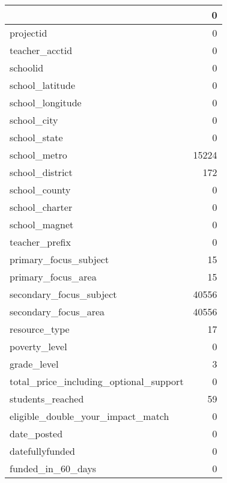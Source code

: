 \begin{tabular}{lr}
\toprule
{} &      0 \\
\midrule
projectid                              &      0 \\
teacher\_acctid                         &      0 \\
schoolid                               &      0 \\
school\_latitude                        &      0 \\
school\_longitude                       &      0 \\
school\_city                            &      0 \\
school\_state                           &      0 \\
school\_metro                           &  15224 \\
school\_district                        &    172 \\
school\_county                          &      0 \\
school\_charter                         &      0 \\
school\_magnet                          &      0 \\
teacher\_prefix                         &      0 \\
primary\_focus\_subject                  &     15 \\
primary\_focus\_area                     &     15 \\
secondary\_focus\_subject                &  40556 \\
secondary\_focus\_area                   &  40556 \\
resource\_type                          &     17 \\
poverty\_level                          &      0 \\
grade\_level                            &      3 \\
total\_price\_including\_optional\_support &      0 \\
students\_reached                       &     59 \\
eligible\_double\_your\_impact\_match      &      0 \\
date\_posted                            &      0 \\
datefullyfunded                        &      0 \\
funded\_in\_60\_days                      &      0 \\
\bottomrule
\end{tabular}
